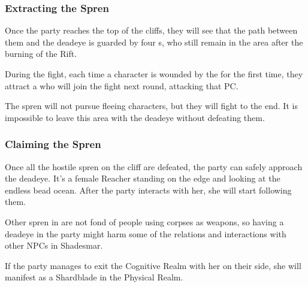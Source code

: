 \subsubsection{Extracting the Spren}

Once the party reaches the top of the cliffs, they will see that the path between them and the deadeye is guarded by four \enemyAngerSpren{}s, who still remain in the area after the burning of the Rift.

During the fight, each time a character is wounded by the \enemyAngerSpren{} for the first time, they attract a \enemyPainSpren{} who will join the fight next round, attacking that PC.

The spren will not pursue fleeing characters, but they will fight to the end. It is impossible to leave this area with the deadeye without defeating them.

\subsubsection{Claiming the Spren}

Once all the hostile spren on the cliff are defeated, the party can safely approach the deadeye. It's a female Reacher standing on the edge and looking at the endless bead ocean. After the party interacts with her, she will start following them.

Other spren in are not fond of people using corpses as weapons, so having a deadeye in the party might harm some of the relations and interactions with other NPCs in Shadesmar.

 If the party manages to exit the Cognitive Realm with her on their side, she will manifest as a Shardblade in the Physical Realm.
 



